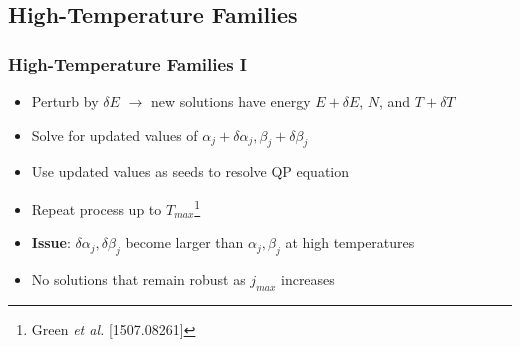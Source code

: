 \documentclass[mathserif,10pt]{beamer}
\newcommand{\bi}{\begin{itemize}}
\newcommand{\ei}{\end{itemize}}
\newcommand{\its}{\item}
\newcommand{\scr}{\scriptsize}
\begin{document}
{{\begin{columns}
\begin{figure}
  \end{figure}
  \end{columns}
 
}


\subsection{High-Temperature Families}
\frame
{
  \frametitle{High-Temperature Families I}
  \bi
  \its Perturb by $\delta E$ $\to$ new solutions have energy $E + \delta E$, $N$, and $T + \delta T$
  \its Solve for updated values of $\alpha_j + \delta \alpha_j, \beta_j + \delta \beta_j$
  \its Use updated values as seeds to resolve QP equation
  \its Repeat process up to $T_{max}$\footnote<1->{{\scr Green {\it et al.}} [1507.08261]}
  \its<2->{{\bf Issue}: $\delta \alpha_j, \delta \beta_j$ become larger than $\alpha_j, \beta_j$ at high temperatures}
  \its<2->{No solutions that remain robust as $j_{max}$ increases}
  \ei
}

}
\end{document}
